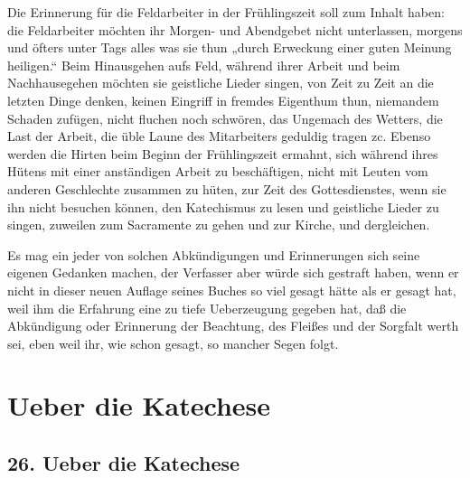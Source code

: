 Die Erinnerung für die Feldarbeiter in der Frühlingszeit soll zum Inhalt haben: die Feldarbeiter möchten ihr Morgen- und Abendgebet nicht unterlassen, morgens und öfters unter Tags alles was sie thun „durch Erweckung einer guten Meinung heiligen.“ Beim Hinausgehen aufs Feld, während ihrer Arbeit und beim Nachhausegehen möchten sie geistliche Lieder singen, von Zeit zu Zeit an die letzten Dinge denken, keinen Eingriff in fremdes Eigenthum thun, niemandem Schaden zufügen, nicht fluchen noch schwören, das Ungemach des Wetters, die Last der Arbeit, die üble Laune des Mitarbeiters geduldig tragen zc. Ebenso werden die Hirten beim Beginn der Frühlingszeit ermahnt, sich während ihres Hütens mit einer anständigen Arbeit zu beschäftigen, nicht mit Leuten vom anderen
Geschlechte zusammen zu hüten, zur Zeit des Gottesdienstes, wenn sie ihn nicht besuchen können, den Katechismus zu lesen und geistliche Lieder zu singen, zuweilen zum Sacramente zu gehen und zur Kirche, und dergleichen.

Es mag ein jeder von solchen Abkündigungen und Erinnerungen sich seine eigenen Gedanken machen, der Verfasser aber würde sich gestraft haben, wenn er nicht in dieser neuen Auflage seines Buches so viel gesagt hätte als er gesagt hat, weil ihm die Erfahrung eine zu tiefe Ueberzeugung gegeben hat, daß die Abkündigung oder Erinnerung der Beachtung, des Fleißes und der Sorgfalt werth sei, eben weil ihr, wie schon gesagt, so mancher Segen folgt.

\chapter{Ueber die Katechese}

\section{26. Ueber die Katechese}

